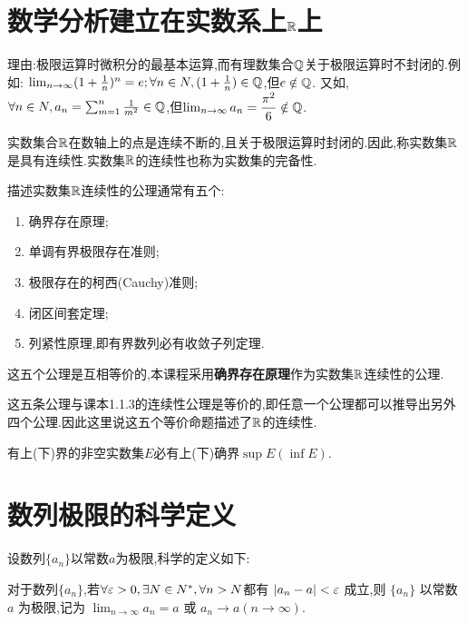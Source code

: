 \section{数学分析建立在实数系上$\mathbb{R}$上}

理由:极限运算时微积分的最基本运算,而有理数集合$\mathbb{Q}$关于极限运算时不封闭的.例如:
$\lim_{n \to \infty} (1+\frac1n)^n=e;\forall n\in N, (1+\frac1n)\in \mathbb{Q}$,但$e \notin \mathbb{Q}$.
又如,$\forall n\in N, a_n=\sum_{m=1}^n \frac1{m^2} \in \mathbb{Q}$,但$\lim_{n \to \infty} a_n=\dfrac{\pi^2}{6}\notin \mathbb{Q}$.

实数集合$\mathbb{R}$在数轴上的点是连续不断的,且关于极限运算时封闭的.因此,称实数集$\mathbb{R}$是具有连续性.实数集$\mathbb{R}$的连续性也称为实数集的完备性.

描述实数集$\mathbb{R}$连续性的公理通常有五个:
\begin{enumerate}
    \item 确界存在原理;
    \item 单调有界极限存在准则;
    \item 极限存在的柯西(Cauchy)准则;
    \item 闭区间套定理;
    \item 列紧性原理,即有界数列必有收敛子列定理.
\end{enumerate}

这五个公理是互相等价的,本课程采用\textbf{确界存在原理}作为实数集$\mathbb{R}$连续性的公理.

\begin{remark}
这五条公理与课本1.1.3的连续性公理是等价的,即任意一个公理都可以推导出另外四个公理.因此这里说这五个等价命题描述了$\mathbb{R}$的连续性.
\end{remark}

\begin{theorem}[公理:确界存在原理]
    有上(下)界的非空实数集$E$必有上(下)确界$\sup E(\inf E)$.
\end{theorem}

\section{数列极限的科学定义}

设数列$\{a_n\}$以常数$a$为极限,科学的定义如下:

\begin{definition}[数列极限]\label{def:sequence_limit}
    对于数列$\{a_n\}$,若$\forall \varepsilon >0, \exists N\in N^*, \forall n>N $都有 $|a_n-a|<\varepsilon$ 成立,则 $\{a_n\}$ 以常数 $a$ 为极限,记为 $\lim_{n \to \infty} a_n=a$ 或 $a_n\rightarrow a (n\rightarrow \infty)$.
\end{definition}

